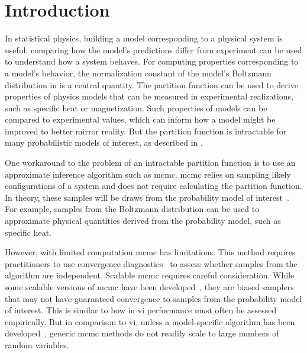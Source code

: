 \section{Introduction}
In statistical physics, building a model corresponding to a physical system is useful: comparing how the model's predictions differ from experiment can be used to understand how a system behaves. For computing properties corresponding to a model's behavior, the normalization constant of the model's Boltzmann distribution in  is a central quantity. The partition function can be used to derive properties of physics models that can be measured in experimental realizations, such as specific heat or magnetization. Such properties of models can be compared to experimental values, which can inform how a model might be improved to better mirror reality. But the partition function is intractable for many probabilistic models of interest, as described in .

One workaround to the problem of an intractable partition function is to use an approximate inference algorithm such as \gls{mcmc}. \gls{mcmc} relies on sampling likely configurations of a system and does not require calculating the partition function. In theory, these samples will be draws from the probability model of interest~\citep{metropolis1953equation,andrieu2003an-introduction}. For example, samples from the Boltzmann distribution can be used to approximate physical quantities derived from the probability model, such as specific heat.

However, with limited computation \gls{mcmc} has limitations. This method requires practitioners to use convergence diagnostics~\citep{brooks1998general} to assess whether samples from the algorithm are independent. Scalable \gls{mcmc} requires careful consideration. While some scalable versions of \gls{mcmc} have been developed~\citep{neal2011mcmc,welling2011bayesian}, they are biased samplers that may not have guaranteed convergence to samples from the probability model of interest. This is similar to how in \gls{vi} performance must often be assessed empirically. But in comparison to \gls{vi}, unless a model-specific algorithm has been developed~\citep{wolff1989comparison}, generic \gls{mcmc} methods do not readily scale to large numbers of random variables.

